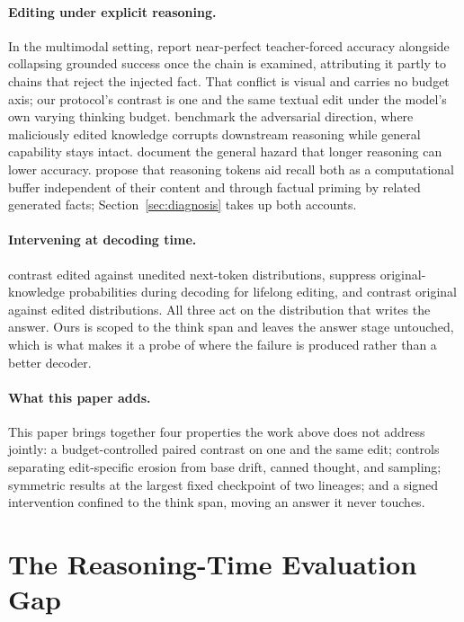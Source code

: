 \documentclass[letterpaper]{article} %
\begin{document}
\paragraph{Editing under explicit reasoning.}  In the multimodal setting, \citet{huang2026crane} report near-perfect teacher-forced accuracy alongside collapsing grounded success once the chain is examined, attributing it partly to chains that reject the injected fact.  That conflict is visual and carries no budget axis; our protocol's contrast is one and the same textual edit under the model's own varying thinking budget.  \citet{editrisk2026} benchmark the adversarial direction, where maliciously edited knowledge corrupts downstream reasoning while general capability stays intact.  \citet{gema2025inverse} document the general hazard that longer reasoning can lower accuracy.  \citet{gekhman2026thinking} propose that reasoning tokens aid recall both as a computational buffer independent of their content and through factual priming by related generated facts; Section~\ref{sec:diagnosis} takes up both accounts.

\paragraph{Intervening at decoding time.}  \citet{bi2024deck} contrast edited against unedited next-token distributions, \citet{jung2026lightedit} suppress original-knowledge probabilities during decoding for lifelong editing, and \citet{sun2024disco} contrast original against edited distributions.  All three act on the distribution that writes the answer.  Ours is scoped to the think span and leaves the answer stage untouched, which is what makes it a probe of where the failure is produced rather than a better decoder.

\paragraph{What this paper adds.}  This paper brings together four properties the work above does not address jointly: a budget-controlled paired contrast on one and the same edit; controls separating edit-specific erosion from base drift, canned thought, and sampling; symmetric results at the largest fixed checkpoint of two lineages; and a signed intervention confined to the think span, moving an answer it never touches.

\section{The Reasoning-Time Evaluation Gap}
\label{sec:gap}
\end{document}
